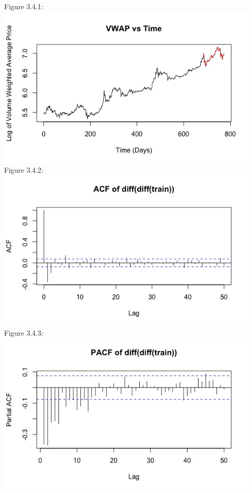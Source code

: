 \documentclass[12pt]{article}
\begin{document}
\begin{center}
  Figure 3.4.1:\\
  \includegraphics[width=5in]{plots/ts_plot4.jpeg}\\

  Figure 3.4.2:\\
  \includegraphics[width=5in]{plots/ts_plot5.jpeg}\\

  Figure 3.4.3:\\
  \includegraphics[width=5in]{plots/ts_plot6.jpeg}\\


\end{center}
\end{document}
